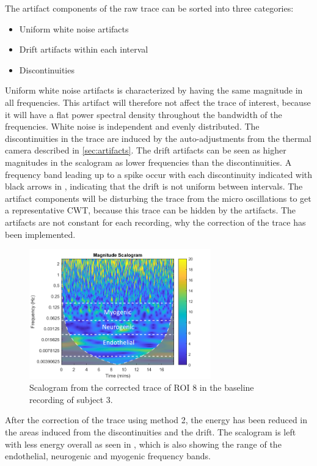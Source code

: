 The artifact components of the raw trace can be sorted into three categories: 
\begin{itemize}
	\item Uniform white noise artifacts
    \item Drift artifacts within each interval
	\item Discontinuities
\end{itemize}

Uniform white noise artifacts is characterized by having the same magnitude in all frequencies. This artifact will therefore not affect the trace of interest, because it will have a flat power spectral density throughout the bandwidth of the frequencies. White noise is independent and evenly distributed\cite{hida2014}. 
The discontinuities in the trace are induced by the auto-adjustments from the thermal camera described in \ref{sec:artifacts}. The drift artifacts can be seen as higher magnitudes in the scalogram as lower frequencies than the discontinuities. A frequency band leading up to a spike occur with each discontinuity indicated with black arrows in , indicating that the drift is not uniform between intervals.
The artifact components will be disturbing the trace from the micro oscillations to get a representative CWT, because this trace can be hidden by the artifacts. The artifacts are not constant for each recording, why the correction of the trace has been implemented.

\begin{figure}[H]
	\includegraphics[width=0.7\textwidth]{figures/cwt_sub3_reg8_corr_uncuffed}
	\caption{Scalogram from the corrected trace of ROI 8 in the baseline recording of subject 3.}
	\label{fig:scalogram_corr}
\end{figure} 

After the correction of the trace using method 2, the energy has been reduced in the areas induced from the discontinuities and the drift. The scalogram is left with less energy overall as seen in , which is also showing the range of the endothelial, neurogenic and myogenic frequency bands. %


